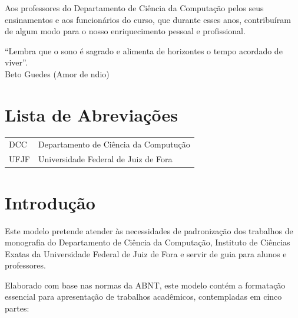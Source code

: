 \documentclass{article}
\begin{document}
Aos professores do Departamento de Ci\^encia da Computa\c{c}\~ao pelos seus
ensinamentos e aos funcion\'arios do curso, que durante esses anos,
contribu\'iram de algum modo para o nosso enriquecimento pessoal e
profissional.
\newpage


\begin{epigrafe}
``Lembra que o sono \'e sagrado e alimenta de horizontes o tempo acordado de viver''.\\
\hfill Beto Guedes (Amor de  ndio)
\end{epigrafe}



 
\thispagestyle{empty} 



\chapter*{Lista de Abrevia\c{c}\~oes} 
\doublespacing  \begin{tabular}{l l}

DCC & Departamento de Ci\^encia da Computu\c{c}\~ao \\
UFJF & Universidade Federal de Juiz de Fora \\



\end{tabular}  \thispagestyle{empty}




%
%
%
\pagestyle{ruledheader}
\chapter{Introdu\c{c}\~ao}
Este modelo pretende atender \`as necessidades de padroniza\c{c}\~ao dos trabalhos de monografia do Departamento de Ci\^encia da Computa\c{c}\~ao, Instituto de Ci\^encias Exatas da Universidade Federal de Juiz de Fora e servir de guia para alunos e professores.
 
Elaborado com base nas normas da ABNT, este modelo cont\'em a formata\c{c}\~ao essencial para apresenta\c{c}\~ao de trabalhos acad\^emicos, contempladas em  cinco partes:
\end{document}
